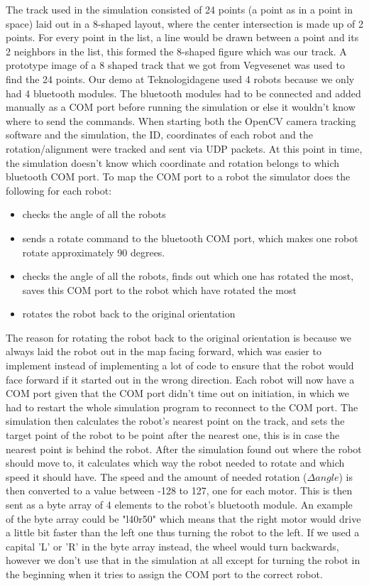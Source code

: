 The track used in the simulation consisted of 24 points (a point as in a point in space) laid out in a 8-shaped layout, where the center intersection is made up of 2 points. For every point in the list, a line would be drawn between a point and its 2 neighbors in the list, this formed the 8-shaped figure which was our track.
A prototype image of a 8 shaped track that we got from Vegvesenet was used to find the 24 points. 
Our demo at Teknologidagene used 4 robots because we only had 4 bluetooth modules. The bluetooth modules had to be connected and added manually as a COM port before running the simulation or else it wouldn't know where to send the commands. When starting both the OpenCV camera tracking software and the simulation, the ID, coordinates of each robot and the rotation/alignment were tracked and sent via UDP packets. At this point in time, the simulation doesn't know which coordinate and rotation belongs to which bluetooth COM port. To map the COM port to a robot the simulator does the following for each robot:
\begin{itemize}
    \item checks the angle of all the robots
    \item sends a rotate command to the bluetooth COM port, which makes one robot rotate approximately 90 degrees.
    \item checks the angle of all the robots, finds out which one has rotated the most, saves this COM port to the robot which have rotated the most
    \item rotates the robot back to the original orientation
\end{itemize}
The reason for rotating the robot back to the original orientation is because we always laid the robot out in the map facing forward, which was easier to implement instead of implementing a lot of code to ensure that the robot would face forward if it started out in the wrong direction.
Each robot will now have a COM port given that the COM port didn't time out on initiation, in which we had to restart the whole simulation program to reconnect to the COM port.
The simulation then calculates the robot's nearest point on the track, and sets the target point of the robot to be point after the nearest one, this is in case the nearest point is behind the robot. After the simulation found out where the robot should move to, it calculates which way the robot needed to rotate and which speed it should have. The speed and the amount of needed rotation ($\Delta angle$) is then converted to a value between -128 to 127, one for each motor. This is then sent as a byte array of 4 elements to the robot's bluetooth module. An example of the byte array could be "l40r50" which means that the right motor would drive a little bit faster than the left one thus turning the robot to the left.
If we used a capital 'L' or 'R' in the byte array instead, the wheel would turn backwards, however we don't use that in the simulation at all except for turning the robot in the beginning when it tries to assign the COM port to the correct robot.

